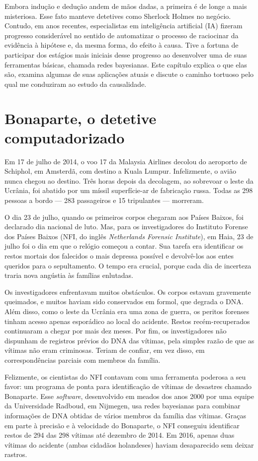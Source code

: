 \documentclass[11pt,a5paper,twoside]{book}
\begin{document}
Embora indução e dedução andem de mãos dadas, a primeira é de longe a mais misteriosa. Esse fato manteve detetives como Sherlock Holmes no negócio. Contudo, em anos recentes, especialistas em inteligência artificial (IA) fizeram progresso considerável no sentido de automatizar o processo de raciocinar da evidência à hipótese e, da mesma forma, do efeito à causa. Tive a fortuna de participar dos estágios mais iniciais desse progresso ao desenvolver uma de suas ferramentas básicas, chamada redes bayesianas. Este capítulo explica o que elas são, examina algumas de suas aplicações atuais e discute o caminho tortuoso pelo qual me conduziram ao estudo da causalidade.

\section{Bonaparte, o detetive computadorizado}
Em 17 de julho de 2014, o voo 17 da Malaysia Airlines decolou do aeroporto de Schiphol, em Amsterdã, com destino a Kuala Lumpur. Infelizmente, o avião nunca chegou ao destino. Três horas depois da decolagem, ao sobrevoar o leste da Ucrânia, foi abatido por um míssil superfície-ar de fabricação russa. Todas as 298 pessoas a bordo — 283 passageiros e 15 tripulantes — morreram.

O dia 23 de julho, quando os primeiros corpos chegaram aos Países Baixos, foi declarado dia nacional de luto. Mas, para os investigadores do Instituto Forense dos Países Baixos (NFI, do inglês \textit{Netherlands Forensic Institute}), em Haia, 23 de julho foi o dia em que o relógio começou a contar. Sua tarefa era identificar os restos mortais dos falecidos o mais depressa possível e devolvê-los aos entes queridos para o sepultamento. O tempo era crucial, porque cada dia de incerteza traria nova angústia às famílias enlutadas.

Os investigadores enfrentavam muitos obstáculos. Os corpos estavam gravemente queimados, e muitos haviam sido conservados em formol, que degrada o DNA. Além disso, como o leste da Ucrânia era uma zona de guerra, os peritos forenses tinham acesso apenas esporádico ao local do acidente. Restos recém-recuperados continuaram a chegar por mais dez meses. Por fim, os investigadores não dispunham de registros prévios do DNA das vítimas, pela simples razão de que as vítimas não eram criminosas. Teriam de confiar, em vez disso, em correspondências parciais com membros da família.

Felizmente, os cientistas do NFI contavam com uma ferramenta poderosa a seu favor: um programa de ponta para identificação de vítimas de desastres chamado Bonaparte. Esse \textit{software}, desenvolvido em meados dos anos 2000 por uma equipe da Universidade Radboud, em Nijmegen, usa redes bayesianas para combinar informações de DNA obtidas de vários membros da família das vítimas. Graças em parte à precisão e à velocidade do Bonaparte, o NFI conseguiu identificar restos de 294 das 298 vítimas até dezembro de 2014. Em 2016, apenas duas vítimas do acidente (ambas cidadãos holandeses) haviam desaparecido sem deixar rastros.
\end{document}
